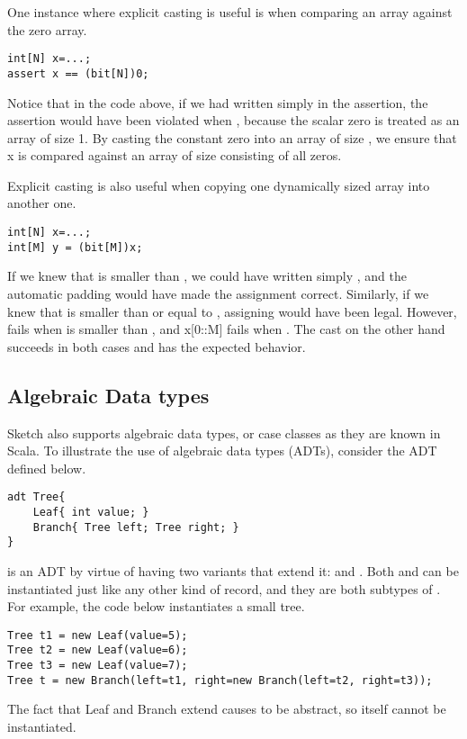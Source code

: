 \begin{Example}
One instance where explicit casting is useful is when comparing an array against the zero array.
\begin{lstlisting}
int[N] x=...;
assert x == (bit[N])0;
\end{lstlisting}
Notice that in the code above, if we had written simply  in the assertion, the assertion would have been violated when , because the scalar zero is treated as an array of size 1. By casting the constant zero into an array of size , we ensure that x is compared against an array of size  consisting of all zeros.
\end{Example}

\begin{Example}
Explicit casting is also useful when copying one dynamically sized array into another one.
\begin{lstlisting}
int[N] x=...;
int[M] y = (bit[M])x;
\end{lstlisting}
If we knew that  is smaller than , we could have written simply , and the automatic padding would have made the assignment correct. Similarly, if we knew that  is smaller than or equal to , assigning  would have been legal. However,  fails when  is smaller than , and x[0::M] fails when . The cast on the other hand succeeds in both cases and has the expected behavior.
\end{Example}



\subsection{Algebraic Data types}
Sketch also supports algebraic data types, or case classes as they are known in Scala. To illustrate the use of algebraic data types (ADTs), consider the  ADT defined below. 
\begin{lstlisting}
adt Tree{
    Leaf{ int value; }
    Branch{ Tree left; Tree right; }
}
\end{lstlisting}
 is an ADT by virtue of having two variants that extend it:  and . Both  and  can be instantiated just like any other kind of record, and they are both subtypes of . For example, the code below instantiates a small tree.

\begin{lstlisting}
Tree t1 = new Leaf(value=5);
Tree t2 = new Leaf(value=6);
Tree t3 = new Leaf(value=7);
Tree t = new Branch(left=t1, right=new Branch(left=t2, right=t3));
\end{lstlisting}
The fact that Leaf and Branch extend  causes  to be abstract, so  itself cannot be instantiated. 

